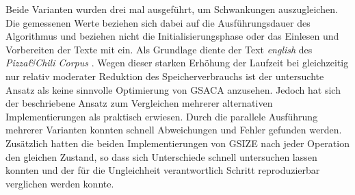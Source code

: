 Beide Varianten wurden drei mal ausgeführt, um Schwankungen auszugleichen.
Die gemessenen Werte beziehen sich dabei auf die Ausführungsdauer des Algorithmus und beziehen nicht die Initialisierungsphase oder das Einlesen und Vorbereiten der Texte mit ein.
Als Grundlage diente der Text \textit{english} des \textit{Pizza\&Chili Corpus} \cite{testdaten:pizzachilli2007}.
Wegen dieser starken Erhöhung der Laufzeit bei gleich\-zeitig nur relativ moderater Reduktion des Speicherverbrauchs ist der untersuchte Ansatz als keine sinnvolle Optimierung von GSACA anzusehen.
Jedoch hat sich der beschriebene Ansatz zum Vergleichen mehrerer alternativen Implementierungen als praktisch erwiesen.
Durch die parallele Ausführung mehrerer Varianten konnten schnell Abweichungen und Fehler gefunden werden.
Zusätz\-lich hatten die beiden Implementierungen von GSIZE nach jeder Operation den gleichen Zustand, so dass sich Unterschiede schnell untersuchen lassen konnten und der für die Ungleichheit verantwortlich Schritt reproduzierbar verglichen werden konnte. \par



